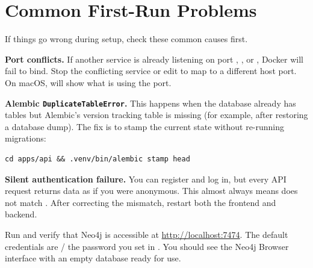 \section{Common First-Run Problems}
\label{sec:first-run-problems}

If things go wrong during setup, check these common causes first.

\begin{warning}
\textbf{Port conflicts.}  If another service is already listening on port
, , or , Docker will fail to bind.  Stop the
conflicting service or edit  to map to a different
host port.  On macOS,  will show what is using the port.
\end{warning}

\begin{warning}
\textbf{Alembic \texttt{DuplicateTableError}.}  This happens when the database
already has tables but Alembic's version tracking table is missing (for example,
after restoring a database dump).  The fix is to stamp the current state without
re-running migrations:

\begin{lstlisting}[style=bash, numbers=none]
cd apps/api && .venv/bin/alembic stamp head
\end{lstlisting}
\end{warning}

\begin{warning}
\textbf{Silent authentication failure.}  You can register and log in, but every
API request returns data as if you were anonymous.  This almost always means
 does not match .  After
correcting the mismatch, restart both the frontend and backend.
\end{warning}

\begin{tryit}
Run  and verify that Neo4j is accessible at
\url{http://localhost:7474}.  The default credentials are
 / the password you set in .  You should see
the Neo4j Browser interface with an empty database ready for use.
\end{tryit}

